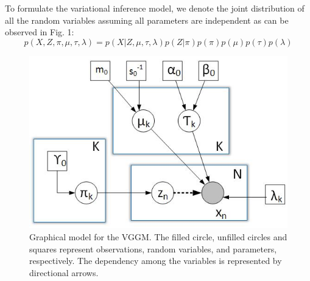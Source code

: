 \documentclass[conference]{IEEEtran}
\begin{document}
To formulate the variational inference model, we denote
the joint distribution of all the random variables assuming all parameters are independent as can be observed in Fig. 1: 
\begin{equation}
    p(X, Z, \pi, \mu, \tau, \lambda) = p(X|Z, \mu, \tau, \lambda)p(Z|\pi)p(\pi)p(\mu)p(\tau)p(\lambda)
\end{equation}
\begin{figure}[h!]
    \begin{center}
        \includegraphics[width=0.7\linewidth]{imgresults/model.jpeg}
        \caption{Graphical model for the VGGM. 
        The filled circle, unfilled circles and squares represent observations, random variables, and parameters, respectively. The dependency among the variables is represented by directional arrows.}
        \label{VGGM Graphical Model}    
    \end{center}
\end{figure}
\end{document}
